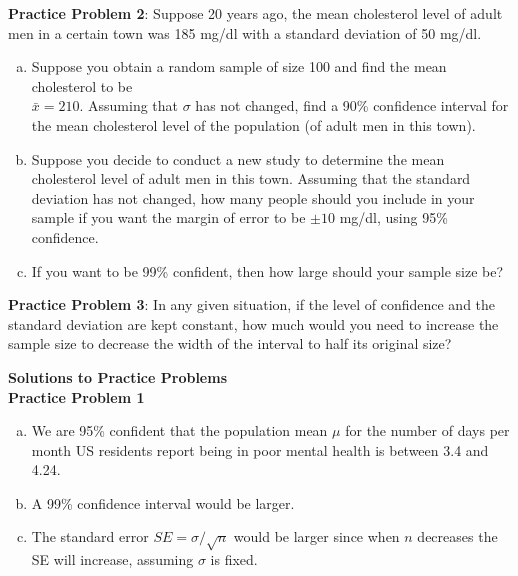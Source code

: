 \documentclass[fleqn, 11pt]{article}\usepackage[]{graphicx}\usepackage[]{color}
\begin{document}
\textbf{Practice Problem 2}: Suppose 20 years ago, the mean cholesterol level of adult men in a certain town was 185 mg/dl with a standard deviation of 50 mg/dl.
\begin{enumerate}[(a)]
\item Suppose you obtain a random sample of size 100 and find the mean cholesterol to be\\ $\bar{x} = 210$.  Assuming that $\sigma$ has not changed, find a 90\% confidence interval for the mean cholesterol level of the population (of adult men in this town).
\item Suppose you decide to conduct a new study to determine the mean cholesterol level of adult men in this town.  Assuming that the standard deviation has not changed, how many people should you include in your sample if you want the margin of error to be $\pm 10$ mg/dl, using 95\% confidence.
\item If you want to be 99\% confident, then how large should your sample size be?\\
\end{enumerate}

\textbf{Practice Problem 3}: In any given situation, if the level of confidence and the standard deviation are kept constant, how much would you need to increase the sample size to decrease the width of the interval to half its original size?\\

\newpage

\textbf{Solutions to Practice Problems}\\

\textbf{Practice Problem 1}
\begin{enumerate}[(a)]
\item We are 95\% confident that the population mean $\mu$ for the number of days per month US residents report being in poor mental health is between 3.4 and 4.24.
\item A 99\% confidence interval would be larger.
\item The standard error $SE=\sigma / \sqrt{n}$ would be larger since when $n$ decreases the SE will increase, assuming $\sigma$ is fixed.\\
\end{enumerate}
\end{document}
